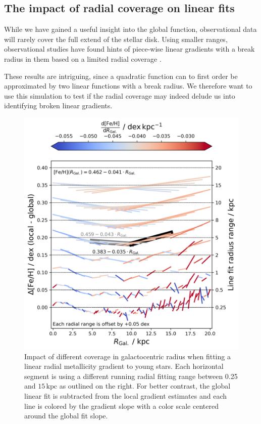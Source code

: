 \documentclass[fleqn,usenatbib]{mnras}
\begin{document}
\subsection{The impact of radial coverage on linear fits}

While we have gained a useful insight into the global function, observational data will rarely cover the full extend of the stellar disk. Using smaller ranges, observational studies have found hints of piece-wise linear gradients with a break radius in them based on a limited radial coverage \citep[e.g.][]{Yong2012, Donor2020, Chen2023}.

These results are intriguing, since a quadratic function can to first order be approximated by two linear functions with a break radius. We therefore want to use this simulation to test if the radial coverage may indeed delude us into identifying broken linear gradients.

\begin{figure}
    \centering
    \includegraphics[width=\columnwidth]{figures/radial_range_impact.png}
    \caption{Impact of different coverage in galactocentric radius when fitting a linear radial metallicity gradient to young stars. Each horizontal segment is using a different running radial fitting range between 0.25 and $15\,\mathrm{kpc}$ as outlined on the right. For better contrast, the global linear fit is subtracted from the local gradient estimates and each line is colored by the gradient slope with a color scale centered around the global fit slope.}
    \label{fig:radial_range_impact}
\end{figure}
\end{document}
